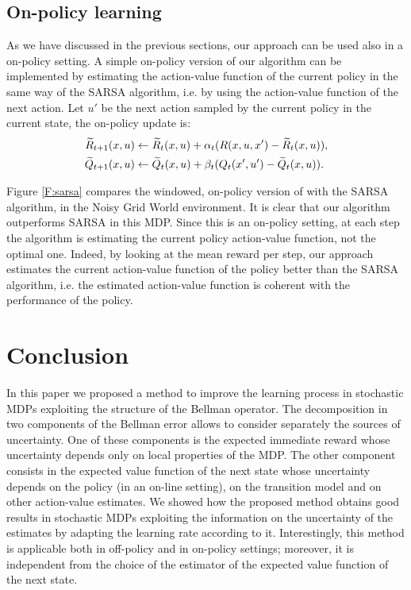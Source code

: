 \documentclass[conference]{IEEEtran}
\begin{document}
\subsection{On-policy learning}
As we have discussed in the previous sections, our approach can be used also in a on-policy setting. A simple on-policy version of our algorithm can be implemented by estimating the action-value function of the current policy in the same way of the SARSA algorithm, i.e. by using the action-value function of the next action. Let $u'$ be the next action sampled by the current policy in the current state, the on-policy update is:
\begin{align*}
\widetilde{R}_{t+1}(x,u) & \leftarrow\widetilde{R}_t(x,u)+\alpha_t(R(x,u,x')-\widetilde{R}_t(x,u)),\\
\widetilde{Q}_{t+1}(x,u) & \leftarrow\widetilde{Q}_t(x,u)+\beta_t(Q_t(x',u')-\widetilde{Q}_t(x,u)).
\end{align*}

Figure \ref{F:sarsa} compares the windowed, on-policy version of \alg with the SARSA algorithm, in the Noisy Grid World environment. It is clear that our algorithm outperforms SARSA in this MDP.
Since this is an on-policy setting, at each step the algorithm is estimating the current policy action-value function, not the optimal one. Indeed, by looking at the mean reward per step, our approach estimates the current action-value function of the policy better than the SARSA algorithm, i.e. the estimated action-value function is coherent with the performance of the policy.

\section{Conclusion}
In this paper we proposed a method to improve the learning process in stochastic MDPs exploiting the structure of the Bellman operator. The decomposition in two components of the Bellman error allows to consider separately the sources of uncertainty. One of these components is the expected immediate reward whose uncertainty depends only on local properties of the MDP. The other component consists in the expected value function of the next state whose uncertainty depends on the policy (in an on-line setting), on the transition model and on other action-value estimates. We showed how the proposed method obtains good results in stochastic MDPs exploiting the information on the uncertainty of the estimates by adapting the learning rate according to it. Interestingly, this method is applicable both in off-policy and in on-policy settings; moreover, it is independent from the choice of the estimator of the expected value function of the next state.
\end{document}
